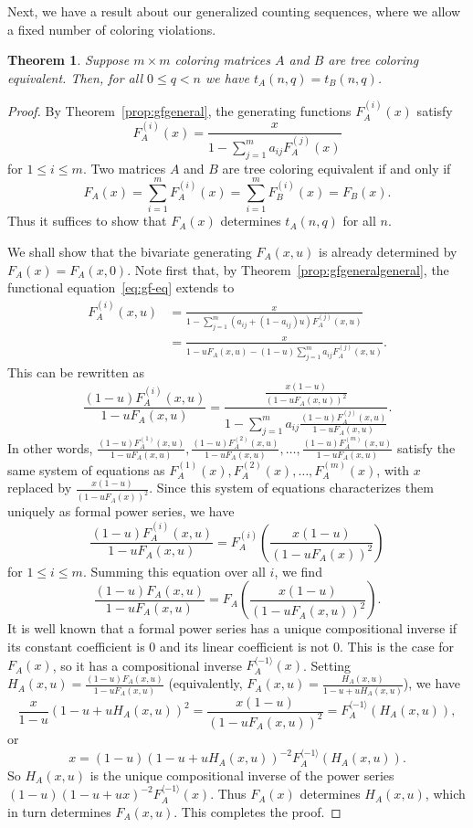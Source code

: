 \documentclass[12pt]{amsart}
\newtheorem{theorem}{Theorem}
\newcommand{\gfll}[1]{F_{#1}(x)}
\newcommand{\gfall}{\gfll{A}}
\newcommand{\gff}[2]{F_{#2}^{(#1)}(x)}
\newcommand{\gfa}[1]{\gff{#1}{A}}
\begin{document}
Next, we have a result about our generalized counting sequences, where we allow a fixed number of coloring violations.
\begin{theorem}\label{thm:strongcomplement}
    Suppose $m\times m$ coloring matrices $A$ and $B$ are tree coloring equivalent. Then, for all $0\leq q<n$ we have $t_A(n,q)=t_B(n,q)$.
\end{theorem}
\begin{proof}
    By Theorem~\ref{prop:gfgeneral}, the generating functions $\gfa{i}$ satisfy
    \begin{equation}\label{eq:gf-eq}
    \gfa{i}= \frac{x}{1-\sum_{j=1}^m a_{ij} \gfa{j}}   
    \end{equation}
    for $1 \leq i \leq m$.
    Two matrices $A$ and $B$ are tree coloring equivalent if and only if
    \[
    \gfall = \sum_{i=1}^m \gfa{i} =  \sum_{i=1}^m \gff{i}{B} = \gfll{B}.\]
    Thus it suffices to show that $\gfall$ determines $t_A(n,q)$ for all $n$.
    
    We shall show that the bivariate generating $F_A(x,u)$ is already determined by $\gfall = F_A(x,0)$. Note first that, by Theorem~\ref{prop:gfgeneralgeneral}, the functional equation~\eqref{eq:gf-eq} extends to
    \begin{align*}
    F_A^{(i)}(x,u) &= \frac{x}{1-\sum_{j=1}^m (a_{ij} + (1-a_{ij})u) F_A^{(j)}(x,u)} \\
    &= \frac{x}{1- u F_A(x,u) - (1-u) \sum_{j=1}^m a_{ij}F_A^{(j)}(x,u)}.
    \end{align*}
    This can be rewritten as
    \[
    \frac{(1-u)F_A^{(i)}(x,u)}{1-u F_A(x,u)} = \frac{\frac{x(1-u)}{(1- u F_A(x,u))^2}}{1 - \sum_{j=1}^m a_{ij} \frac{(1-u)F_A^{(j)}(x,u)}{1-u F_A(x,u)}}.
    \]
    In other words, $\frac{(1-u)F_A^{(1)}(x,u)}{1-uF_A(x,u)},\frac{(1-u)F_A^{(2)}(x,u)}{1-uF_A(x,u)}, \ldots, \frac{(1-u)F_A^{(m)}(x,u)}{1-uF_A(x,u)}$ satisfy the same system of equations as $\gfa{1},\gfa{2},\ldots,\gfa{m}$, with $x$ replaced by $\frac{x(1-u)}{(1- u F_A(x))^2}$. Since this system of equations characterizes them uniquely as formal power series, we have
    \[
    \frac{(1-u)F_A^{(i)}(x,u)}{1-u F_A(x,u)} = F_A^{(i)}\!\left(\frac{x(1-u)}{(1- u F_A(x))^2}\right)
    \]
    for $1 \leq i \leq m$. Summing this equation over all $i$, we find
    \[
    \frac{(1-u)F_A(x,u)}{1-uF_A(x,u)} = F_A \!\left( \frac{x(1-u)}{(1-uF_A(x,u))^2} \right).
    \]
    It is well known that a formal power series has a unique compositional inverse if its constant coefficient is $0$ and its linear coefficient is not $0$. This is the case for $\gfall$, so it has a compositional inverse $F_A^{\langle-1 \rangle}(x)$. Setting $H_A(x,u) = \frac{(1-u)F_A(x,u)}{1-uF_A(x,u)}$ (equivalently, $F_A(x,u) = \frac{H_A(x,u)}{1-u+uH_A(x,u)}$), we have
    \[
    \frac{x}{1-u}(1-u+uH_A(x,u))^2 = \frac{x(1-u)}{(1-uF_A(x,u))^2} = F_A^{\langle-1 \rangle}(H_A(x,u)),
    \]
    or
    \[
    x = (1-u)(1-u+uH_A(x,u))^{-2} F_A^{\langle-1 \rangle}(H_A(x,u)).
    \]
    So $H_A(x,u)$ is the unique compositional inverse of the power series $(1-u)(1-u+ux)^{-2} F_A^{\langle-1 \rangle}(x)$. Thus $\gfall$ determines $H_A(x,u)$, which in turn determines $F_A(x,u)$. This completes the proof.
\end{proof}
\end{document}
